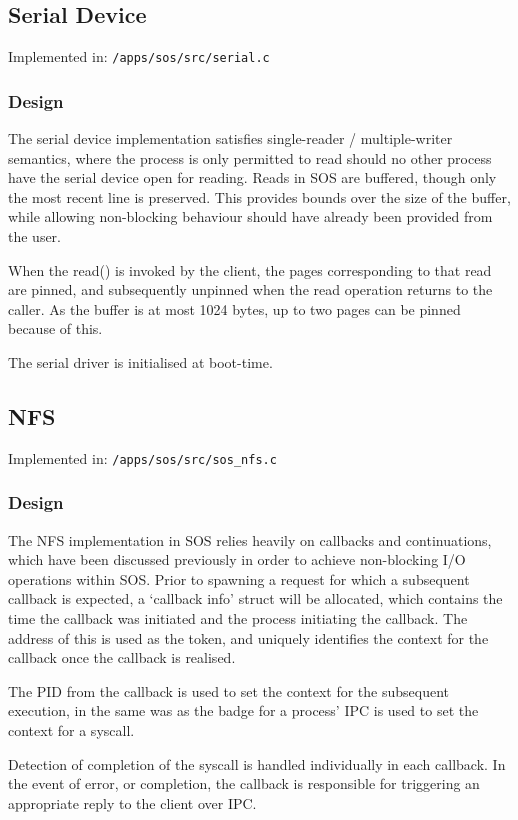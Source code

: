 \documentclass[a4paper,12pt]{article}
\begin{document}
\subsection{Serial Device}
Implemented in: \texttt{/apps/sos/src/serial.c}

\subsubsection{Design}
The serial device implementation satisfies single-reader / multiple-writer
semantics, where the process is only permitted to read should no other process
have the serial device open for reading.  Reads in SOS are buffered, though
only the most recent line is preserved.  This provides bounds over the size of
the buffer, while allowing non-blocking behaviour should have already been
provided from the user.

When the read() is invoked by the client, the pages corresponding to that read
are pinned, and subsequently unpinned when the read operation returns to the
caller.  As the buffer is at most 1024 bytes, up to two pages can be pinned
because of this.

The serial driver is initialised at boot-time.

\subsection{NFS}
Implemented in: \texttt{/apps/sos/src/sos\_nfs.c}

\subsubsection{Design}
The NFS implementation in SOS relies heavily on callbacks and continuations,
which have been discussed previously in order to achieve non-blocking I/O
operations within SOS.  Prior to spawning a request for which a subsequent
callback is expected, a `callback info' struct will be allocated, which
contains the time the callback was initiated and the process initiating the
callback.  The address of this is used as the token, and uniquely identifies
the context for the callback once the callback is realised.

The PID from the callback is used to set the context for the subsequent
execution, in the same was as the badge for a process' IPC is used to set the
context for a syscall.

Detection of completion of the syscall is handled individually in each
callback.  In the event of error, or completion, the callback is responsible
for triggering an appropriate reply to the client over IPC.
\end{document}
